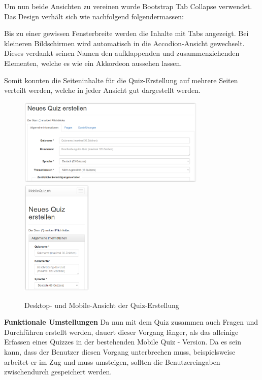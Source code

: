 Um nun beide Ansichten zu vereinen wurde \glqq Bootstrap Tab Collapse\grqq \cite{bootstrap-tabcollapse} verwendet. Das Design verhält sich wie nachfolgend folgendermassen:

Bis zu einer gewissen Fensterbreite werden die Inhalte mit Tabs angezeigt. Bei kleineren Bildschirmen wird automatisch in die Accodion-Ansicht gewechselt. Dieses verdankt seinen Namen den aufklappenden und zusammenziehenden Elementen, welche es wie ein Akkordeon aussehen lassen.

Somit konnten die Seiteninhalte für die Quiz-Erstellung auf mehrere Seiten verteilt werden, welche in jeder Ansicht gut dargestellt werden.


\begin{figure}[H]
	\centering
	\includegraphics[width=0.8\textwidth]{Images/Quiz_Erstellen1.PNG}
	\includegraphics[width=0.3\textwidth]{Images/Quiz_Erstellen_Mobile.PNG}
	\caption{Desktop- und Mobile-Ansicht der Quiz-Erstellung}
\end{figure}


\textbf{Funktionale Umstellungen}
Da nun mit dem Quiz zusammen auch Fragen und Durchführen erstellt werden, dauert dieser Vorgang länger, als das alleinige Erfassen eines Quizzes in der bestehenden Mobile Quiz - Version. Da es sein kann, dass der Benutzer diesen Vorgang unterbrechen muss, beispielsweise arbeitet er im Zug und muss umsteigen, sollten die Benutzereingaben zwischendurch gespeichert werden.

